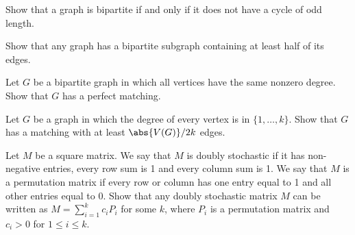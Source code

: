 \documentclass[answers]{exam}
\begin{document}
\begin{questions}
\question%
Show that a graph is bipartite if and only if it does not have a cycle of odd length.



\question%
Show that any graph has a bipartite subgraph containing at least half of its edges.



\question%
Let $G$ be a bipartite graph in which all vertices have the same nonzero degree. Show that $G$ has a perfect matching.



\question%
Let $G$ be a graph in which the degree of every vertex is in $\{1, \ldots, k\}$. Show that $G$ has a matching with at least $\abs{V(G)} / 2 k$ edges.



\question%
Let $M$ be a square matrix. We say that $M$ is doubly stochastic if it has non-negative entries, every row sum is 1 and every column sum is 1. We say that $M$ is a permutation matrix if every row or column has one entry equal to 1 and all other entries equal to 0. Show that any doubly stochastic matrix $M$ can be written as $M=\sum_{i=1}^{k} c_{i} P_{i}$ for some $k$, where $P_{i}$ is a permutation matrix and $c_{i}>0$ for $1 \leqslant i \leqslant k$.

\end{questions}
\end{document}
